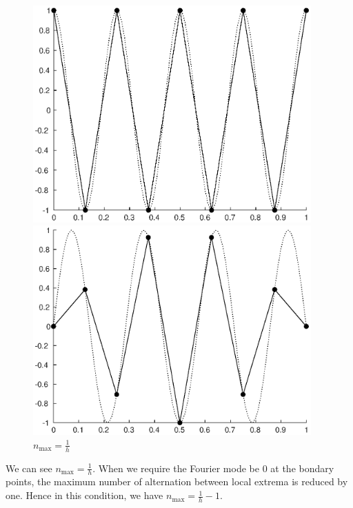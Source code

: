 \documentclass[twoside,a4paper]{article}
\begin{document}
\begin{figure}[H]
    \centering
    \begin{minipage}[t]{0.42\textwidth}
        \centering
        \includegraphics[width=0.95\textwidth]{figure/ex9_11_1.eps}
        \caption*{$n_\text{max}=\frac{1}{h}$}
    \end{minipage}
    \begin{minipage}[t]{0.42\textwidth}
        \centering
        \includegraphics[width=0.95\textwidth]{figure/ex9_11_2.eps}
    \end{minipage}
\end{figure}

We can see $n_\text{max}=\frac{1}{h}$. When we require the Fourier mode be $0$ at the bondary points, the maximum number of alternation between local extrema is reduced by one. Hence in this condition, we have $n_\text{max}=\frac{1}{h}-1$.
\end{document}
